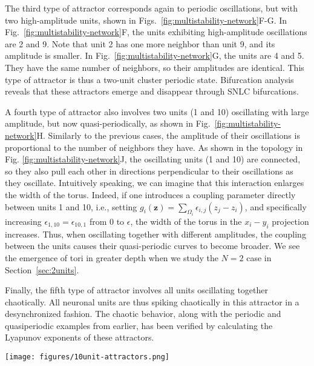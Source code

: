 The third type of attractor corresponds again to periodic oscillations, but with two high-amplitude units, shown in Figs.~\ref{fig:multistability-network}F-G. In Fig.~\ref{fig:multistability-network}F, the units exhibiting high-amplitude oscillations are 2 and 9. Note that unit 2 has one more neighbor than unit 9, and its amplitude is smaller. In Fig.~\ref{fig:multistability-network}G, the units are 4 and 5. They have the same number of neighbors, so their amplitudes are identical. This type of attractor is thus a two-unit cluster periodic state. Bifurcation analysis reveals that these attractors emerge and disappear through SNLC bifurcations.

A fourth type of attractor also involves two units (1 and 10) oscillating with large amplitude, but now quasi-periodically, as shown in Fig.~\ref{fig:multistability-network}H. Similarly to the previous cases, the amplitude of their oscillations is proportional to the number of neighbors they have. As shown in the topology in Fig. \ref{fig:multistability-network}J, the oscillating units (1 and 10) are connected, so they also pull each other in directions perpendicular to their oscillations as they oscillate. Intuitively speaking, we can imagine that this interaction enlarges the width of the torus. Indeed, if one introduces a coupling parameter directly between units 1 and 10, i.e., setting $g_i(\mathbf{z}) = \sum_{\Omega_i}\epsilon_{i,j}(z_j-z_i)$, and specifically increasing $\epsilon_{1,10} = \epsilon_{10,1}$ from $0$ to $\epsilon$, the width of the torus in the $x_i-y_i$ projection increases. Thus, when oscillating together with different amplitudes, the coupling between the units causes their quasi-periodic curves to become broader. We see the emergence of tori in greater depth when we study the $N = 2$ case in Section~\ref{sec:2units}.

Finally, the fifth type of attractor involves all units oscillating together chaotically. All neuronal units are thus spiking chaotically in this attractor in a desynchronized fashion. The chaotic behavior, along with the periodic and quasiperiodic examples from earlier, has been verified by calculating the Lyapunov exponents of these attractors.

\begin{figure*}[ht!]
    \centering 
    \texttt{[image: figures/10unit-attractors.png]}
    \caption{Rich multistability arising from diffusive coupling. Panels I-H show the stable equilibrium, periodic, quasi-periodic and chaotic attractors that coexist in the same network with $N=10$ randomly coupled units (shown in Panel J) with $\epsilon=0.15$. Each panel shows a trajectory on one of the attractors, projected onto the $x_i-y_i$ subspaces of each unit, all overlaid on top of each other. Circles correspond to the positions of the units at some arbitrarily chosen time point. The units are colored from blue to red according to their index, as shown in the topology of panel J, such that unit $1$ is a deep blue and unit $10$ is a deep red.}
    \label{fig:multistability-network}
\end{figure*}

